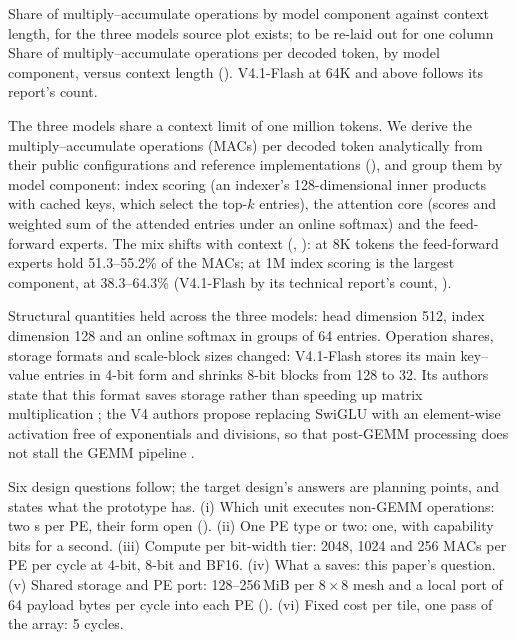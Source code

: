 %
  {Share of multiply--accumulate operations by model component against context length, for the three models}%
  {source plot exists; to be re-laid out for one column}%
  {Share of multiply--accumulate operations per decoded token, by model component, versus context length (\evAnalytic). V4.1-Flash at 64K and above follows its report's count.}

\begin{table}[t]
\centering{}%
\caption{Demands of one decode step for three models from two generations; analytical counts, not measurements. V4.1-Flash at 1M follows its report's count; cache bytes include block scales.}\label{tab:workload-gen}

\end{table}

%
The three models share a context limit of one million tokens.
We derive the multiply--accumulate operations (MACs) per decoded token analytically from their public configurations and reference implementations (), and group them by model component: index scoring (an indexer's 128-dimensional inner products with cached keys, which select the top-$k$ entries), the attention core (scores and weighted sum of the attended entries under an online softmax) and the feed-forward experts.
The mix shifts with context (, ): at 8K tokens the feed-forward experts hold 51.3--55.2\% of the MACs; at 1M index scoring is the largest component, at 38.3--64.3\% (V4.1-Flash by its technical report's count, ).

%
Structural quantities held across the three models: head dimension 512, index dimension 128 and an online softmax in groups of 64 entries.
Operation shares, storage formats and scale-block sizes changed: V4.1-Flash stores its main key--value entries in 4-bit form and shrinks 8-bit blocks from 128 to 32.
Its authors state that this format saves storage rather than speeding up matrix multiplication \cite{DeepSeekAI2026V41Flash}; the V4 authors propose replacing SwiGLU with an element-wise activation free of exponentials and divisions, so that post-GEMM processing does not stall the GEMM pipeline .

%
Six design questions follow; the target design's answers are planning points, and  states what the prototype has.
(i) Which unit executes non-GEMM operations: two \VectorCore{}s per PE, their form open ().
(ii) One PE type or two: one, with capability bits for a second.
(iii) Compute per bit-width tier: 2048, 1024 and 256 MACs per PE per cycle at 4-bit, 8-bit and BF16.
(iv) What a \blockscaled \handoff saves: this paper's question.
(v) Shared storage and PE port: 128--256\,MiB per $8\times8$ mesh and a local port of 64 payload bytes per cycle into each PE ().
(vi) Fixed cost per tile, one pass of the array: 5 cycles.
